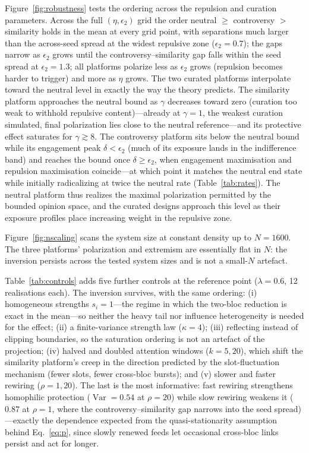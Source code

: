 \documentclass[5p,times,twocolumn]{elsarticle}
\begin{document}
Figure~\ref{fig:robustness} tests the ordering across the repulsion and
curation parameters. Across the full $(\eta, \epsilon_2)$ grid the order
neutral $\ge$ controversy $>$ similarity holds in the mean at every grid
point, with separations much larger than the across-seed spread at the
widest repulsive zone ($\epsilon_2 = 0.7$); the gaps narrow as
$\epsilon_2$ grows until the controversy--similarity gap falls within the
seed spread at $\epsilon_2 = 1.3$; all platforms
polarize less as $\epsilon_2$ grows (repulsion becomes harder to trigger)
and more as $\eta$ grows. The two curated platforms interpolate toward the
neutral level in exactly the way the theory predicts. The similarity
platform approaches the neutral bound as $\gamma$ decreases toward zero
(curation too weak to withhold repulsive content)---already at
$\gamma = 1$, the weakest curation simulated, final polarization lies
close to the neutral reference---and its protective effect saturates for
$\gamma \gtrsim 8$. The controversy platform sits below the neutral bound
while its engagement peak $\delta < \epsilon_2$ (much of its exposure
lands in the indifference band) and reaches the bound once
$\delta \ge \epsilon_2$, when engagement maximisation and repulsion
maximisation coincide---at which point it matches the neutral end state
while initially radicalizing at twice the neutral rate
(Table~\ref{tab:rates}). The neutral platform thus realizes the maximal
polarization permitted by the bounded opinion space, and the curated
designs approach this level as their exposure profiles place increasing
weight in the repulsive zone.

Figure~\ref{fig:nscaling} scans the system size at constant density up to
$N = 1600$. The three platforms' polarization and extremism are
essentially flat in $N$: the inversion persists across the tested
system sizes and is not a small-$N$ artefact.

Table~\ref{tab:controls} adds five further controls at the reference
point ($\lambda = 0.6$, 12 realisations each). The inversion survives,
with the same ordering: (i) homogeneous strengths $s_i = 1$---the regime
in which the two-bloc reduction is exact in the mean---so neither the
heavy tail nor influence heterogeneity is needed for the effect; (ii) a
finite-variance strength law ($\kappa = 4$); (iii) reflecting instead of
clipping boundaries, so the saturation ordering is not an artefact of the
projection; (iv) halved and doubled attention windows ($k = 5, 20$),
which shift the similarity platform's creep in the direction predicted by
the slot-fluctuation mechanism (fewer slots, fewer cross-bloc bursts);
and (v) slower and faster rewiring ($\rho = 1, 20$). The last is the most
informative: fast rewiring strengthens homophilic protection
($\operatorname{Var} = 0.54$ at $\rho = 20$) while slow rewiring weakens
it ($0.87$ at $\rho = 1$, where the controversy--similarity gap narrows
into the seed spread)---exactly the dependence expected from the
quasi-stationarity assumption behind Eq.~\eqref{eq:p}, since slowly
renewed feeds let occasional cross-bloc links persist and act for longer.
\end{document}
